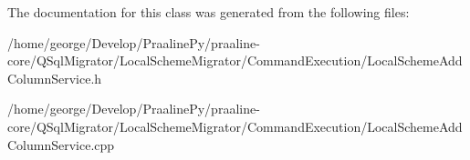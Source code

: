 The documentation for this class was generated from the following files\+:\begin{DoxyCompactItemize}
\item 
/home/george/\+Develop/\+Praaline\+Py/praaline-\/core/\+Q\+Sql\+Migrator/\+Local\+Scheme\+Migrator/\+Command\+Execution/Local\+Scheme\+Add\+Column\+Service.\+h\item 
/home/george/\+Develop/\+Praaline\+Py/praaline-\/core/\+Q\+Sql\+Migrator/\+Local\+Scheme\+Migrator/\+Command\+Execution/Local\+Scheme\+Add\+Column\+Service.\+cpp\end{DoxyCompactItemize}
